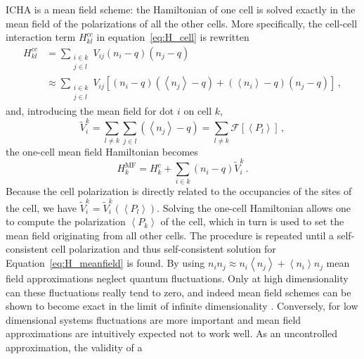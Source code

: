 %
ICHA is a mean field scheme: the Hamiltonian of one cell is
solved exactly in the mean field of the polarizations of all the other cells.
More specifically, the cell-cell interaction term $H^{cc}_{kl}$ in
equation~\eqref{eq:H_cell} is rewritten
\begin{equation}
\begin{split}
  \label{eq:H_kl_meanfield}
  H^{cc}_{kl} 
  &=
  \sum_{\substack{i \in k\\j \in l}} V_{ij} \left( n_i - q \right) \left( n_j - q \right) \\
  &\approx
  \sum_{\substack{i \in k\\j \in l}} V_{ij} 
       \left[ \left( n_i - q \right) \left( \left< n_j \right> - q \right)
              +
              \left( \left< n_i \right> - q \right) \left( n_j - q \right)
       \right] \, ,
\end{split}
\end{equation}
and, introducing the mean field for dot $i$ on cell $k$,
\begin{equation}
  \label{eq:V_meanfield}
  \tilde{V}_i^k
  = \sum_{l \ne k} \sum_{j \in l} \left( \left< n_j \right> - q \right)
  = \sum_{l \ne k} \mathcal{F} \left[ \left< P_l \right> \right] \, ,
\end{equation}
the one-cell mean field Hamiltonian becomes
\begin{equation}
  \label{eq:H_meanfield}
  H^{\mathrm{MF}}_k
  = H^c_k + \sum_{i \in k} \left( n_i - q \right) \tilde{V}_i^k \, .
\end{equation}
Because the cell polarization is directly related to the occupancies of the
sites of the cell, we have $\tilde{V}_i^k = \tilde{V}_i^k(\left<P_l\right>)$.
Solving the one-cell Hamiltonian allows one to compute the polarization $\left<
P_k \right>$ of the cell, which in turn is used to set the mean field
originating from all other cells. The procedure is repeated until a
self-consistent cell polarization and thus self-consistent solution for
Equation~\eqref{eq:H_meanfield} is found. By using $n_i n_j \approx n_i \left<
n_j \right> + \left< n_i \right> n_j$ mean field approximations neglect quantum
fluctuations. Only at high dimensionality can these fluctuations really tend to
zero, and indeed mean field schemes can be shown to become exact in the limit of
infinite dimensionality \cite{Fehske}. Conversely, for low dimensional systems
fluctuations are more important and mean field approximations are intuitively
expected not to work well. As an uncontrolled approximation, the validity of a
